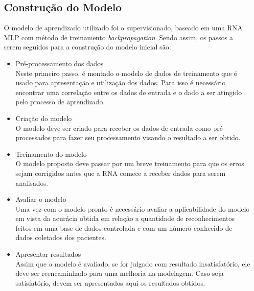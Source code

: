    \subsection{Construção do Modelo}

        O modelo de aprendizado utilizado foi o supervisionado, baseado em uma RNA MLP com método de treinamento \textit{backpropagation}.
        Sendo assim, os passos a serem seguidos para a construção do modelo inicial são:

        \begin{itemize}
            \item Pré-processamento dos dados \\ Neste primeiro passo, é montado o modelo de dados de treinamento que é usado para apresentação e utilização dos dados. Para isso é necessário encontrar uma correlação entre os dados de entrada e o dado a ser atingido pelo processo de aprendizado.

            \item Criação do modelo \\ O modelo deve ser criado para receber os dados de entrada como pré-processados para fazer seu processamento visando o resultado a ser obtido.

            \item Treinamento do modelo \\ O modelo proposto deve passar por um breve treinamento para que os erros sejam corrigidos antes que a RNA comece a receber dados para serem analisados.

            \item Avaliar o modelo \\ Uma vez com o modelo pronto é necessário avaliar a aplicabilidade do modelo em vista da acurácia obtida em relação a quantidade de reconhecimentos feitos em uma base de dados controlada e com um número conhecido de dados coletados dos pacientes.

            \item Apresentar resultados \\ Assim que o modelo é avaliado, se for julgado com resultado insatisfatório, ele deve ser reencaminhado para uma melhoria na modelagem. Caso seja satisfatório, devem ser apresentados aqui os resultados obtidos.
        \end{itemize}
